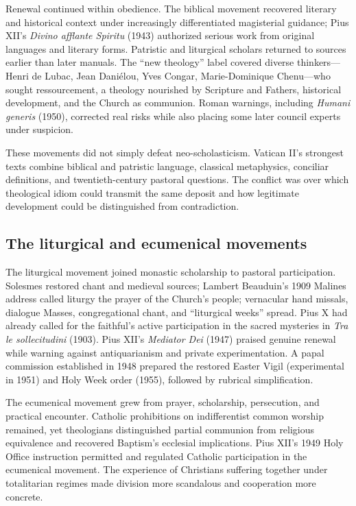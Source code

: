 Renewal continued within obedience. The biblical movement recovered literary and historical context under increasingly differentiated magisterial guidance; Pius XII's \emph{Divino afflante Spiritu} (1943) authorized serious work from original languages and literary forms. Patristic and liturgical scholars returned to sources earlier than later manuals. The “new theology” label covered diverse thinkers—Henri de Lubac, Jean Daniélou, Yves Congar, Marie-Dominique Chenu—who sought ressourcement, a theology nourished by Scripture and Fathers, historical development, and the Church as communion. Roman warnings, including \emph{Humani generis} (1950), corrected real risks while also placing some later council experts under suspicion.

These movements did not simply defeat neo-scholasticism. Vatican II's strongest texts combine biblical and patristic language, classical metaphysics, conciliar definitions, and twentieth-century pastoral questions. The conflict was over which theological idiom could transmit the same deposit and how legitimate development could be distinguished from contradiction.

\subsection{The liturgical and ecumenical movements}

The liturgical movement joined monastic scholarship to pastoral participation. Solesmes restored chant and medieval sources; Lambert Beauduin's 1909 Malines address called liturgy the prayer of the Church's people; vernacular hand missals, dialogue Masses, congregational chant, and “liturgical weeks” spread. Pius X had already called for the faithful's active participation in the sacred mysteries in \emph{Tra le sollecitudini} (1903). Pius XII's \emph{Mediator Dei} (1947) praised genuine renewal while warning against antiquarianism and private experimentation. A papal commission established in 1948 prepared the restored Easter Vigil (experimental in 1951) and Holy Week order (1955), followed by rubrical simplification.

The ecumenical movement grew from prayer, scholarship, persecution, and practical encounter. Catholic prohibitions on indifferentist common worship remained, yet theologians distinguished partial communion from religious equivalence and recovered Baptism's ecclesial implications. Pius XII's 1949 Holy Office instruction permitted and regulated Catholic participation in the ecumenical movement. The experience of Christians suffering together under totalitarian regimes made division more scandalous and cooperation more concrete.

